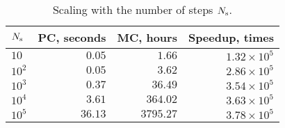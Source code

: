 \begin{table}
  \centering
  \caption{Scaling with the number of steps $N_\text{s}$.}
  \vspace{-10pt}
  \begin{tabular}{lrrr}
    \toprule
    $N_\text{s}$ & PC, seconds & MC, hours & Speedup, times \\
    \midrule
    $   10$ & $ 0.05$ & $   1.66$ & $1.32 \times 10^5$ \\
    $ 10^2$ & $ 0.05$ & $   3.62$ & $2.86 \times 10^5$ \\
    $ 10^3$ & $ 0.37$ & $  36.49$ & $3.54 \times 10^5$ \\
    $ 10^4$ & $ 3.61$ & $ 364.02$ & $3.63 \times 10^5$ \\
    $ 10^5$ & $36.13$ & $3795.27$ & $3.78 \times 10^5$ \\
    \bottomrule
  \end{tabular}
  \vspace{-10pt}
\end{table}
